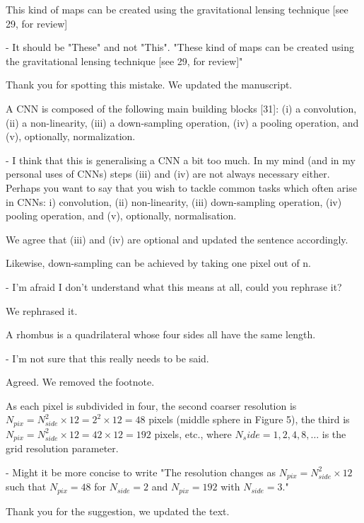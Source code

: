 \documentclass[12pt,a4paper]{article}
\newcommand{\1}{\b{1}}              %
\newcommand{\0}{\b{0}}              %
\begin{document}
\begin{mdframed}[style=comment]
This kind of maps can be created using the gravitational lensing technique [see 29, for review]

- It should be "These" and not "This". "These kind of maps can be created using the gravitational lensing technique [see 29, for review]"
\end{mdframed}
Thank you for spotting this mistake. We updated the manuscript.

\begin{mdframed}[style=comment]
A CNN is composed of the following main building blocks [31]: (i) a convolution, (ii) a non-linearity, (iii) a down-sampling operation, (iv) a pooling operation, and (v), optionally, normalization.

- I think that this is generalising a CNN a bit too much. In my mind (and in my personal uses of CNNs) steps (iii) and (iv) are not always necessary either. Perhaps you want to say that you wish to tackle common tasks which often arise in CNNs: i) convolution, (ii) non-linearity, (iii) down-sampling operation, (iv) pooling operation, and (v), optionally, normalisation.
\end{mdframed}
We agree that (iii) and (iv) are optional and updated the sentence accordingly.

\begin{mdframed}[style=comment]
Likewise, down-sampling can be achieved by taking one pixel out of n.

- I'm afraid I don't understand what this means at all, could you rephrase it?
\end{mdframed}
We rephrased it.

\begin{mdframed}[style=comment]
A rhombus is a quadrilateral whose four sides all have the same length.

- I'm not sure that this really needs to be said.
\end{mdframed}
Agreed. We removed the footnote.

\begin{mdframed}[style=comment]
As each pixel is subdivided in four, the second coarser resolution is $N_{pix} = N_{side}^2\times12=2^2\times12=48$ pixels (middle sphere in Figure 5), the third is $N_{pix} = N_{side}^2\times12=42\times12=192$ pixels, etc., where $N_side =1,2,4,8,\dots$ is the grid resolution parameter.

- Might it be more concise to write "The resolution changes as $N_{pix} = N^2_{side}\times12$ such that $N_{pix} = 48$ for $N_{side} = 2$ and $N_{pix} = 192$ with $N_{side}=3$."
\end{mdframed}
Thank you for the suggestion, we updated the text.
\end{document}
